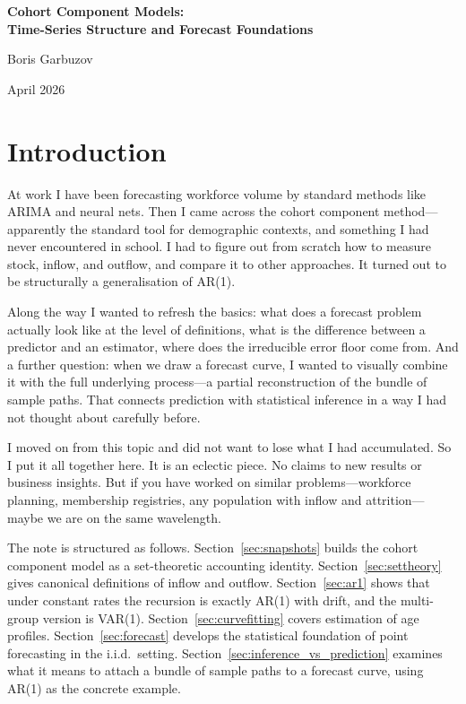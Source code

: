 \documentclass[a4paper,oneside,12pt]{extarticle}
\theoremstyle{plain}
\theoremstyle{definition}
\theoremstyle{remark}
\begin{document}
\begin{center}
{\LARGE\bfseries Cohort Component Models:\\[5pt]
Time-Series Structure and Forecast Foundations}

\bigskip
{\large Boris Garbuzov}

\bigskip
{\small April 2026}
\end{center}

\bigskip
\tableofcontents
\bigskip

\section{Introduction}

At work I have been forecasting workforce volume by standard methods like
ARIMA and neural nets. Then I came across the cohort component
method---apparently the standard tool for demographic contexts, and
something I had never encountered in school. I had to figure out from
scratch how to measure stock, inflow, and outflow, and compare it to other
approaches. It turned out to be structurally a generalisation of AR(1).

Along the way I wanted to refresh the basics: what does a forecast problem
actually look like at the level of definitions, what is the difference
between a predictor and an estimator, where does the irreducible error floor
come from. And a further question: when we draw a forecast curve, I wanted
to visually combine it with the full underlying process---a partial
reconstruction of the bundle of sample paths. That connects prediction with
statistical inference in a way I had not thought about carefully before.

I moved on from this topic and did not want to lose what I had accumulated.
So I put it all together here. It is an eclectic piece. No claims to new
results or business insights. But if you have worked on similar
problems---workforce planning, membership registries, any population with
inflow and attrition---maybe we are on the same wavelength.

\medskip\noindent
The note is structured as follows. Section~\ref{sec:snapshots} builds the
cohort component model as a set-theoretic accounting identity.
Section~\ref{sec:settheory} gives canonical definitions of inflow and
outflow. Section~\ref{sec:ar1} shows that under constant rates the
recursion is exactly AR(1) with drift, and the multi-group version is
VAR(1). Section~\ref{sec:curvefitting} covers estimation of age profiles.
Section~\ref{sec:forecast} develops the statistical foundation of point
forecasting in the i.i.d.\ setting. Section~\ref{sec:inference_vs_prediction}
examines what it means to attach a bundle of sample paths to a forecast
curve, using AR(1) as the concrete example.
\end{document}
